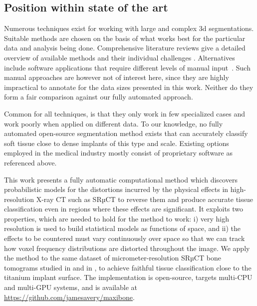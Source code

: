\subsection{Position within state of the art}

Numerous techniques exist for working with large and complex 3d segmentations.
Suitable methods are chosen on the basis of what works best for the particular
data and analysis being done. Comprehensive literature reviews give a detailed
overview of available methods and their individual challenges
\cite{seg_literature_review}. Alternatives include software applications that
require different levels of manual
input~\cite{software_pore3d,software_itk_snap,software_dragonfly,software_avizo}.
Such manual approaches are however not of interest here, since they are highly
impractical to annotate for the data sizes presented in this work. Neither do
they form a fair comparison against our fully automated approach.

Common for all techniques, is that they only work in few specialized cases and
work poorly when applied on different data. To our knowledge, no fully automated
open-source segmentation method exists that can accurately classify soft tissue
close to dense implants of this type and scale. Existing options employed in the
medical industry mostly consist of proprietary software as referenced above.

This work presents a fully automatic computational method which discovers
probabilistic models for the distortions incurred by the physical effects in
high-resolution X-ray CT such as SRµCT to reverse them and produce accurate
tissue classification even in regions where these effects are significant. It
exploits two properties, which are needed to hold for the method to work: i)
very high resolution is used to build statistical models as functions of space,
and ii) the effects to be countered must vary continuously over space so that we
can track how voxel frequency distributions are distorted throughout the image.
We apply the method to the same dataset of micrometer-resolution SRµCT bone
tomograms studied in \cite{torsten2018} and in \cite{sporring}, to achieve
faithful tissue classification close to the titanium implant surface. The
implementation is open-source, targets multi-CPU and multi-GPU systems, and is
available at \href{https://github.com/jamesavery/maxibone}
{https://github.com/jamesavery/maxibone}.


